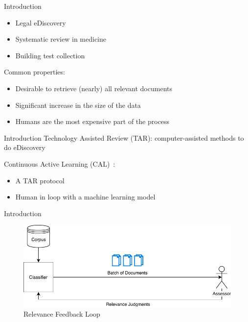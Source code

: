 \documentclass[14pt]{beamer}
\begin{document}
\begin{frame}{Introduction}
    \begin{itemize}
        \item Legal eDiscovery
        \item Systematic review in medicine
        \item Building test collection
    \end{itemize}
    \vskip 0.5cm
    Common properties:
    \begin{itemize}
        \item Desirable to retrieve (nearly) all relevant documents
        \item Significant increase in the size of the data
        \item Humans are the most expensive part of the process
    \end{itemize}

\end{frame}

\begin{frame}{Introduction}
    Technology Assisted Review (TAR): computer-assisted methods to do eDiscovery

    \vskip 1cm
    \pause
    Continuous Active Learning (CAL)~\cite{cormack2014evaluation}:
    \begin{itemize}
        \item A TAR protocol
        \item Human in loop with a machine learning model
    \end{itemize}
\end{frame}

\begin{frame}{Introduction}
\begin{figure}
 \centering 
 \includegraphics[width=1.0\textwidth]{animation/1.pdf}
 \caption{Relevance Feedback Loop}
\end{figure}
\end{frame}
\end{document}
